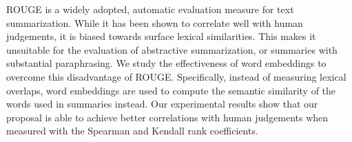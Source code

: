 ROUGE is a widely adopted, automatic evaluation measure for text summarization. While it has been shown to correlate well with human judgements, it is biased towards surface lexical similarities. This makes it unsuitable for the evaluation of abstractive summarization, or summaries with substantial paraphrasing. We study the effectiveness of word embeddings to overcome this disadvantage of ROUGE. Specifically, instead of measuring lexical overlaps, word embeddings are used to compute the semantic similarity of the words used in summaries instead. Our experimental results show that our proposal is able to achieve better correlations with human judgements when measured with the Spearman and Kendall rank coefficients.
